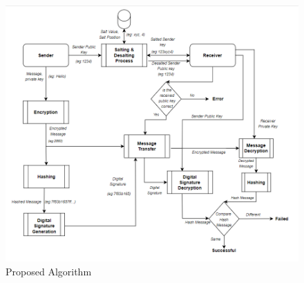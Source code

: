 \begin{figure}[H]
	\centering
	\includegraphics[width=160mm]{images/proposedalgo2.png}{}
	\caption{Proposed Algorithm} %
	\label{Proposed Algorithm} %
\end{figure}

\pagebreak
